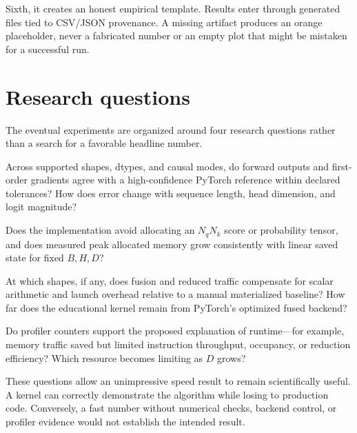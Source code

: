 Sixth, it creates an honest empirical template. Results enter through generated files tied to CSV/JSON provenance. A missing artifact produces an orange placeholder, never a fabricated number or an empty plot that might be mistaken for a successful run.

\section{Research questions}

The eventual experiments are organized around four research questions rather than a search for a favorable headline number.

\begin{description}[style=nextline]
  \item[RQ1: Numerical agreement.] Across supported shapes, dtypes, and causal modes, do forward outputs and first-order gradients agree with a high-confidence PyTorch reference within declared tolerances? How does error change with sequence length, head dimension, and logit magnitude?
  \item[RQ2: Memory behavior.] Does the implementation avoid allocating an $N_qN_k$ score or probability tensor, and does measured peak allocated memory grow consistently with linear saved state for fixed $B,H,D$?
  \item[RQ3: Runtime scaling.] At which shapes, if any, does fusion and reduced traffic compensate for scalar arithmetic and launch overhead relative to a manual materialized baseline? How far does the educational kernel remain from PyTorch's optimized fused backend?
  \item[RQ4: Hardware explanation.] Do profiler counters support the proposed explanation of runtime---for example, memory traffic saved but limited instruction throughput, occupancy, or reduction efficiency? Which resource becomes limiting as $D$ grows?
\end{description}

These questions allow an unimpressive speed result to remain scientifically useful. A kernel can correctly demonstrate the algorithm while losing to production code. Conversely, a fast number without numerical checks, backend control, or profiler evidence would not establish the intended result.
